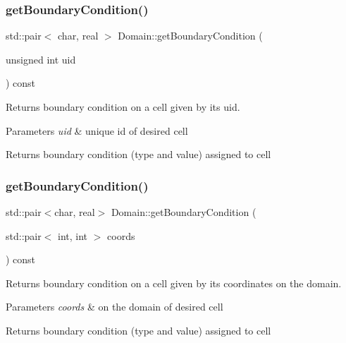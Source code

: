 \subsubsection{\texorpdfstring{get\+Boundary\+Condition()}{getBoundaryCondition()}\hspace{0.1cm}{\footnotesize\ttfamily [2/3]}}
{\footnotesize\ttfamily std\+::pair$<$ char, real $>$ Domain\+::get\+Boundary\+Condition (\begin{DoxyParamCaption}\item[{unsigned int}]{uid }\end{DoxyParamCaption}) const}



Returns boundary condition on a cell given by its uid. 


\begin{DoxyParams}{Parameters}
{\em uid} & unique id of desired cell\\
\hline
\end{DoxyParams}
\begin{DoxyReturn}{Returns}
boundary condition (type and value) assigned to cell 
\end{DoxyReturn}
\mbox{\label{classDomain_aeb1110620465fc735aac4f37962fbf3d}} 
\subsubsection{\texorpdfstring{get\+Boundary\+Condition()}{getBoundaryCondition()}\hspace{0.1cm}{\footnotesize\ttfamily [3/3]}}
{\footnotesize\ttfamily std\+::pair$<$char, real$>$ Domain\+::get\+Boundary\+Condition (\begin{DoxyParamCaption}\item[{std\+::pair$<$ int, int $>$}]{coords }\end{DoxyParamCaption}) const}



Returns boundary condition on a cell given by its coordinates on the domain. 


\begin{DoxyParams}{Parameters}
{\em coords} & on the domain of desired cell\\
\hline
\end{DoxyParams}
\begin{DoxyReturn}{Returns}
boundary condition (type and value) assigned to cell 
\end{DoxyReturn}
\mbox{\label{classDomain_aa0d225e23c6a454058a3df5b7b5973fa}} 
